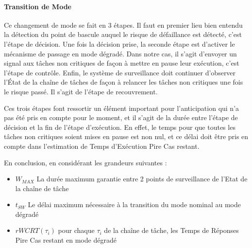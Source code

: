 \documentclass[french, a4paper, 11pt, twoside, pdftex]{StyleThese}
\begin{document}

	\paragraph{Transition de Mode}
    Ce changement de mode se fait en 3 étapes. Il faut en premier lieu bien entendu la détection du point de bascule auquel le risque de défaillance est détecté, c'est l'étape de décision. Une fois la décision prise, la seconde étape est d'activer le mécanisme de passage en mode dégradé. Dans notre cas, il s'agit d'envoyer un signal aux tâches non critiques de façon à mettre en pause leur exécution, c'est l'étape de contrôle. Enfin, le système de surveillance doit continuer d'observer l'État de la chaîne de tâches de façon à relancer les tâches non critiques une fois le risque passé. Il s'agit de l'étape de recouvrement.
    
    Ces trois étapes font ressortir un élément important pour l'anticipation qui n'a pas été pris en compte pour le moment, et il s'agit de la durée entre l'étape de décision et la fin de l'étape d'exécution. En effet, le temps pour que toutes les tâches non critiques soient mises en pause est non nul, et ce délai doit être pris en compte dans l'estimation de Temps d'Exécution Pire Cas restant. %
    
	En conclusion, en considérant les grandeurs suivantes : 
	\begin{itemize}
		\item 	$ W_{MAX} $ La durée maximum garantie entre 2 points de surveillance de l'Etat de la chaîne de tâche
		\item 	$ t_{SW} $ Le délai maximum nécessaire à la transition du mode nominal au mode dégradé
		\item 	$ rWCRT(\tau_i) $ pour chaque $\tau_i$ de la chaîne de tâche, les Temps de Réponses Pire Cas restant en mode dégradé
	\end{itemize}
\end{document}
